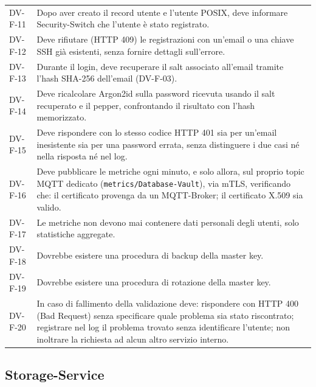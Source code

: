 \begin{longtable}{p{2.6cm} p{\dimexpr\linewidth-2.6cm-4\tabcolsep\relax}}
DV-F-11 & Dopo aver creato il record utente e l'utente POSIX, deve informare Security-Switch che l'utente è stato registrato. \\
DV-F-12 & Deve rifiutare (HTTP 409) le registrazioni con un'email o una chiave SSH già esistenti, senza fornire dettagli sull'errore. \\
DV-F-13 & Durante il login, deve recuperare il salt associato all'email tramite l'hash SHA-256 dell'email (DV-F-03). \\
DV-F-14 & Deve ricalcolare Argon2id sulla password ricevuta usando il salt recuperato e il pepper, confrontando il risultato con l'hash memorizzato. \\
DV-F-15 & Deve rispondere con lo stesso codice HTTP 401 sia per un'email inesistente sia per una password errata, senza distinguere i due casi né nella risposta né nel log. \\
DV-F-16 & Deve pubblicare le metriche ogni minuto, e solo allora, sul proprio topic MQTT dedicato (\texttt{metrics/Database-Vault}), via mTLS, verificando che: il certificato provenga da un MQTT-Broker; il certificato X.509 sia valido. \\
DV-F-17 & Le metriche non devono mai contenere dati personali degli utenti, solo statistiche aggregate. \\
DV-F-18 & Dovrebbe esistere una procedura di backup della master key. \\
DV-F-19 & Dovrebbe esistere una procedura di rotazione della master key. \\
DV-F-20 & In caso di fallimento della validazione deve: rispondere con HTTP 400 (Bad Request) senza specificare quale problema sia stato riscontrato; registrare nel log il problema trovato senza identificare l'utente; non inoltrare la richiesta ad alcun altro servizio interno. \\
\end{longtable}

\subsection{Storage-Service}

